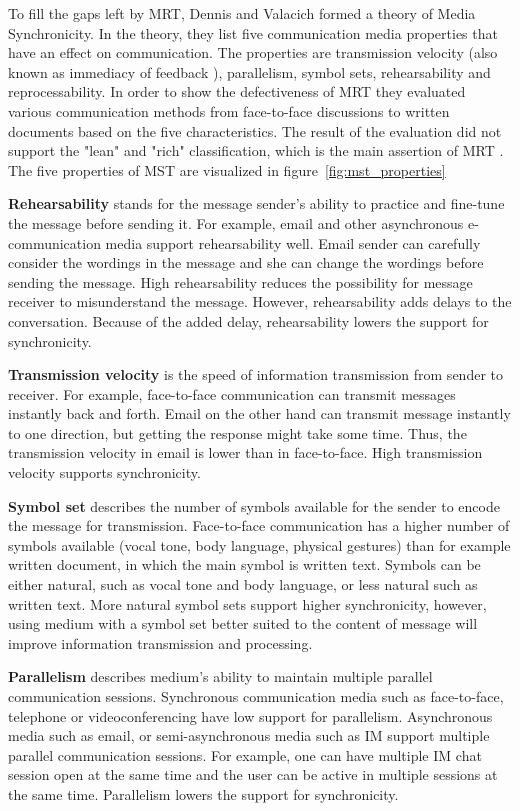 \documentclass[english,12pt,a4paper,pdftex]{article}
\begin{document}
To fill the gaps left by \ac{MRT}, Dennis and Valacich formed a theory of Media Synchronicity. In the theory, they list five communication media properties that have an effect on communication. The properties are transmission velocity (also known as immediacy of feedback \citep{dennis1999}), parallelism, symbol sets, rehearsability and reprocessability. In order to show the defectiveness of \ac{MRT} they evaluated various communication methods from face-to-face discussions to written documents based on the five characteristics. The result of the evaluation did not support the "lean" and "rich" classification, which is the main assertion of \ac{MRT} \citep{dennis2008}. The five properties of \ac{MST} are visualized in figure~\ref{fig:mst_properties}

\textbf{Rehearsability} stands for the message sender's ability to practice and fine-tune the message before sending it. For example, email and other asynchronous e-communication media support rehearsability well. Email sender can carefully consider the wordings in the message and she can change the wordings before sending the message. High rehearsability reduces the possibility for message receiver to misunderstand the message. However, rehearsability adds delays to the conversation. Because of the added delay, rehearsability lowers the support for synchronicity.

\textbf{Transmission velocity} is the speed of information transmission from sender to receiver. For example, face-to-face communication can transmit messages instantly back and forth. Email on the other hand can transmit message instantly to one direction, but getting the response might take some time. Thus, the transmission velocity in email is lower than in face-to-face. High transmission velocity supports synchronicity.

\textbf{Symbol set} describes the number of symbols available for the sender to encode the message for transmission. Face-to-face communication has a higher number of symbols available (vocal tone, body language, physical gestures) than for example written document, in which the main symbol is written text. Symbols can be either natural, such as vocal tone and body language, or less natural such as written text. More natural symbol sets support higher synchronicity, however, using medium with a symbol set better suited to the content of message will improve information transmission and processing.

\textbf{Parallelism} describes medium's ability to maintain multiple parallel communication sessions. Synchronous communication media such as face-to-face, telephone or videoconferencing have low support for parallelism. Asynchronous media such as email, or semi-asynchronous media such as \ac{IM} support multiple parallel communication sessions. For example, one can have multiple \ac{IM} chat session open at the same time and the user can be active in multiple sessions at the same time. Parallelism lowers the support for synchronicity.
\end{document}
